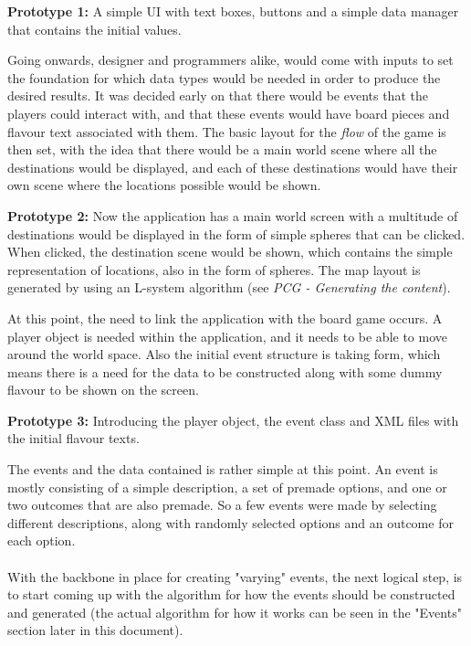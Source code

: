 \begin{center}
\textbf{Prototype 1:}
A simple UI with text boxes, buttons and a simple data manager that contains the initial values.
\end{center}
Going onwards, designer and programmers alike, would come with inputs to set the foundation for which data types would be needed in order to produce the desired results.
It was decided early on that there would be events that the players could interact with, and that these events would have board pieces and flavour text associated with them. The basic layout for the \textit{flow} of the game is then set, with the idea that there would be a main world scene where all the destinations would be displayed, and each of these destinations would have their own scene where the locations possible would be shown.

\begin{center}
\textbf{Prototype 2:}
Now the application has a main world screen with a multitude of destinations would be displayed in the form of simple spheres that can be clicked. When clicked, the destination scene would be shown, which contains the simple representation of locations, also in the form of spheres.
The map layout is generated by using an L-system algorithm (see \textit{PCG - Generating the content}).
\end{center}
At this point, the need to link the application with the board game occurs. A player object is needed within the application, and it needs to be able to move around the world space. Also the initial event structure is taking form, which means there is a need for the data to be constructed along with some dummy flavour to be shown on the screen.

\begin{center}
\textbf{Prototype 3:}
Introducing the player object, the event class and XML files with the initial flavour texts. 
\end{center}
The events and the data contained is rather simple at this point. An event is mostly consisting of a simple description, a set of premade options, and one or two outcomes that are also premade. So a few events were made by selecting different descriptions, along with randomly selected options and an outcome for each option.\\\\
With the backbone in place for creating "varying" events, the next logical step, is to start coming up with the algorithm for how the events should be constructed and generated (the actual algorithm for how it works can be seen in the "Events" section later in this document).

